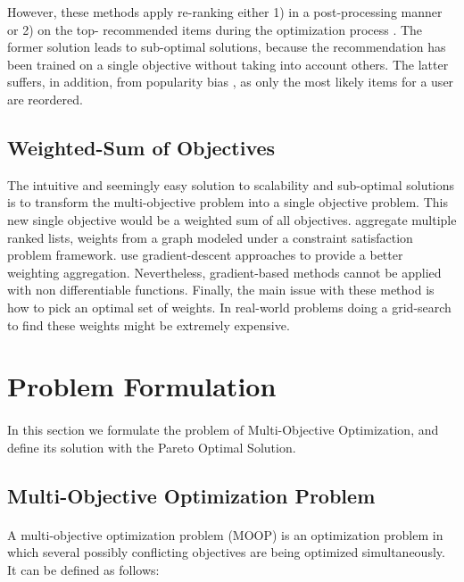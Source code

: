 \documentclass[letterpaper]{article}
\begin{document}
However, these methods apply re-ranking either 1) in a post-processing manner \cite{jugovac2017efficient} or 2) on the top- recommended items during the optimization process \cite{di2017adaptive}. The former solution leads to sub-optimal solutions, because the recommendation has been trained on a single objective without taking into account others. The latter suffers, in addition, from popularity bias \cite{abdollahpouri2017controlling}, as only the most likely items for a user are reordered.

\subsection{Weighted-Sum of Objectives}

The intuitive and seemingly easy solution to scalability and sub-optimal solutions is to transform the multi-objective problem into a single objective problem. This new single objective would be a weighted sum of all objectives. \cite{ribeiro2015multiobjective} aggregate multiple ranked lists, weights from a graph modeled under a constraint satisfaction problem framework\cite{Torrens2002a}. \cite{Lin:2019:PAM:3298689.3346998} use gradient-descent approaches to provide a better weighting aggregation. Nevertheless, gradient-based methods cannot be applied with non differentiable functions. Finally, the main issue with these method is how to pick an optimal set of weights. In real-world problems doing a grid-search to find these weights might be extremely expensive.

\section{Problem Formulation}
\paragraph{}
In this section we formulate the problem of Multi-Objective Optimization, and define its solution with the Pareto Optimal Solution.

\subsection{Multi-Objective Optimization Problem}
\paragraph{}
A multi-objective optimization problem (MOOP) is an optimization problem in which several possibly conflicting objectives are being optimized simultaneously. It can be defined as follows:
\end{document}
